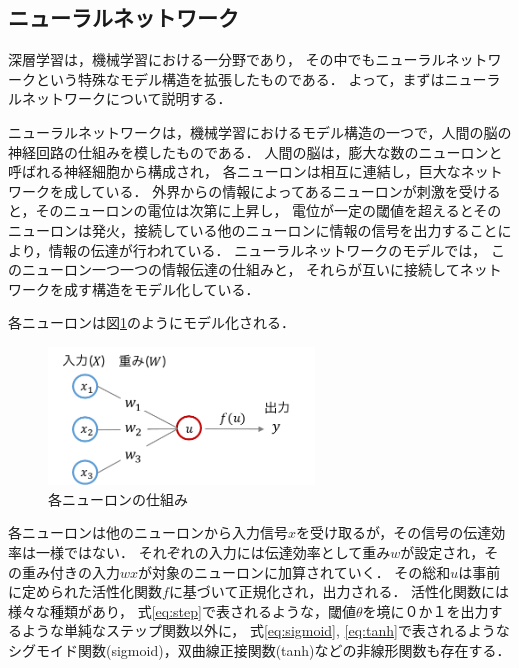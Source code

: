\subsection{ニューラルネットワーク}
深層学習は，機械学習における一分野であり，
その中でもニューラルネットワークという特殊なモデル構造を拡張したものである．
よって，まずはニューラルネットワークについて説明する．

ニューラルネットワークは，機械学習におけるモデル構造の一つで，人間の脳の神経回路の仕組みを模したものである．
人間の脳は，膨大な数のニューロンと呼ばれる神経細胞から構成され，
各ニューロンは相互に連結し，巨大なネットワークを成している．
外界からの情報によってあるニューロンが刺激を受けると，そのニューロンの電位は次第に上昇し，
電位が一定の閾値を超えるとそのニューロンは発火，接続している他のニューロンに情報の信号を出力することにより，情報の伝達が行われている．
ニューラルネットワークのモデルでは，
このニューロン一つ一つの情報伝達の仕組みと，
それらが互いに接続してネットワークを成す構造をモデル化している．

各ニューロンは図\ref{fig:neuron}のようにモデル化される．

\begin{figure}[htb]
\begin{center}
\includegraphics[width=200pt]{./img/neuron.pdf}
\end{center}
\caption{各ニューロンの仕組み}
\label{fig:neuron}
\end{figure}

各ニューロンは他のニューロンから入力信号$x$を受け取るが，その信号の伝達効率は一様ではない．
それぞれの入力には伝達効率として重み$w$が設定され，その重み付きの入力$w x$が対象のニューロンに加算されていく．
その総和$u$は事前に定められた活性化関数$f$に基づいて正規化され，出力される．
活性化関数には様々な種類があり，
式\ref{eq:step}で表されるような，閾値$\theta$を境に０か１を出力するような単純なステップ関数以外に，
式\ref{eq:sigmoid}, \ref{eq:tanh}で表されるようなシグモイド関数(sigmoid)，双曲線正接関数(tanh)などの非線形関数も存在する．

